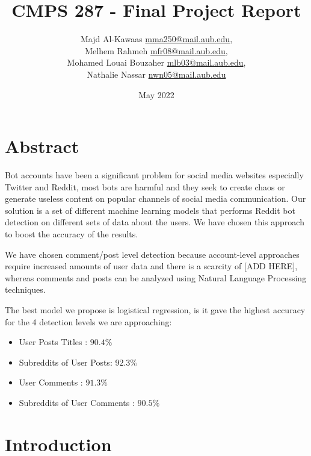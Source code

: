 \documentclass{article}
\title{CMPS 287 - Final Project Report}
\author{Majd Al-Kawaas  \hspace*{5mm} \url{mma250@mail.aub.edu},\\  Melhem Rahmeh \hspace*{5mm} \url{mfr08@mail.aub.edu}, \\ Mohamed Louai Bouzaher \hspace*{5mm} \url{mlb03@mail.aub.edu},\\ Nathalie Nassar \hspace*{5mm} \url{nwn05@mail.aub.edu}

}
\date{May 2022}
\begin{document}
\maketitle

\section{Abstract}
Bot accounts have been a significant problem for social media websites especially Twitter and Reddit, most bots are harmful and they seek to create chaos or generate useless content on popular channels of social media communication. Our solution is a set of different machine learning models that performs Reddit bot detection on different sets of data about the users. We have chosen this approach to boost the accuracy of the results. \par

We have chosen comment/post level detection because account-level approaches require increased amounts of user data and there is a scarcity of [ADD HERE], whereas comments and posts can be analyzed using Natural Language Processing techniques.\par

The best model we propose is logistical regression, is it gave the highest accuracy for the 4 detection levels  we are approaching: \\
\begin{itemize}
\item User Posts Titles : $90.4\%$
\item Subreddits of User Posts: $92.3\%$
\item User Comments : $91.3\%$
\item Subreddits of User Comments : $90.5\%$

\end{itemize}

\section{Introduction}
\end{document}
